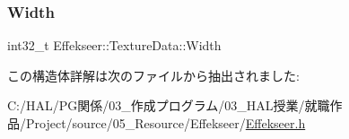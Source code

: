 \subsubsection{\texorpdfstring{Width}{Width}}
{\footnotesize\ttfamily int32\+\_\+t Effekseer\+::\+Texture\+Data\+::\+Width}



この構造体詳解は次のファイルから抽出されました\+:\begin{DoxyCompactItemize}
\item 
C\+:/\+H\+A\+L/\+P\+G関係/03\+\_\+作成プログラム/03\+\_\+\+H\+A\+L授業/就職作品/\+Project/source/05\+\_\+\+Resource/\+Effekseer/\mbox{\hyperlink{_effekseer_8h}{Effekseer.\+h}}\end{DoxyCompactItemize}
